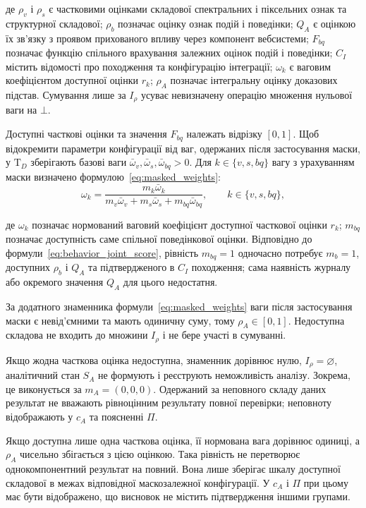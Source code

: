 де $\rho_v$ і $\rho_s$ є частковими оцінками складової спектральних і піксельних ознак та структурної складової; $\rho_b$ позначає оцінку ознак подій і поведінки; $Q_A$ є оцінкою їх зв’язку з проявом прихованого впливу через компонент вебсистеми; $F_{bq}$ позначає функцію спільного врахування залежних оцінок подій і поведінки; $C_I$ містить відомості про походження та конфігурацію інтеграції; $\omega_k$ є ваговим коефіцієнтом доступної оцінки $r_k$; $\rho_A$ позначає інтегральну оцінку доказових підстав. Сумування лише за $I_{\rho}$ усуває невизначену операцію множення нульової ваги на $\bot$.

Доступні часткові оцінки та значення $F_{bq}$ належать відрізку $[0,1]$. Щоб відокремити параметри конфігурації від ваг, одержаних після застосування маски, у $\mathrm T_D$ зберігають базові ваги $\bar\omega_v,\bar\omega_s,\bar\omega_{bq}>0$. Для $k\in\{v,s,bq\}$ вагу з урахуванням маски визначено формулою~\eqref{eq:masked_weights}:
\begin{equation}
\omega_k=\frac{m_k\bar\omega_k}
{m_v\bar\omega_v+m_s\bar\omega_s+m_{bq}\bar\omega_{bq}},\qquad k\in\{v,s,bq\},
\label{eq:masked_weights}
\end{equation}

де $\omega_k$ позначає нормований ваговий коефіцієнт доступної часткової оцінки $r_k$; $m_{bq}$ позначає доступність саме спільної поведінкової оцінки. Відповідно до формули~\eqref{eq:behavior_joint_score}, рівність $m_{bq}=1$ одночасно потребує $m_b=1$, доступних $\rho_b$ і $Q_A$ та підтвердженого в $C_I$ походження; сама наявність журналу або окремого значення $Q_A$ для цього недостатня.

За додатного знаменника формули~\eqref{eq:masked_weights} ваги після застосування маски є невід’ємними та мають одиничну суму, тому $\rho_A\in[0,1]$. Недоступна складова не входить до множини $I_{\rho}$ і не бере участі в сумуванні.

Якщо жодна часткова оцінка недоступна, знаменник дорівнює нулю, $I_{\rho}=\varnothing$, аналітичний стан $S_A$ не формують і реєструють неможливість аналізу. Зокрема, це виконується за $m_A=(0,0,0)$. Одержаний за неповного складу даних результат не вважають рівноцінним результату повної перевірки; неповноту відображають у $c_A$ та поясненні $\Pi$.

Якщо доступна лише одна часткова оцінка, її нормована вага дорівнює одиниці, а $\rho_A$ чисельно збігається з цією оцінкою. Така рівність не перетворює однокомпонентний результат на повний. Вона лише зберігає шкалу доступної складової в межах відповідної маскозалежної конфігурації. У $c_A$ і $\Pi$ при цьому має бути відображено, що висновок не містить підтвердження іншими групами.

